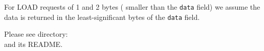 
For LOAD requests of 1 and 2 bytes ({\ie} smaller than the \verb|data|
field) we assume the data is returned in the least-significant bytes
of the \verb|data| field.

\Beginexercise

Please see directory:  \\
and its README.
\Endexercise

